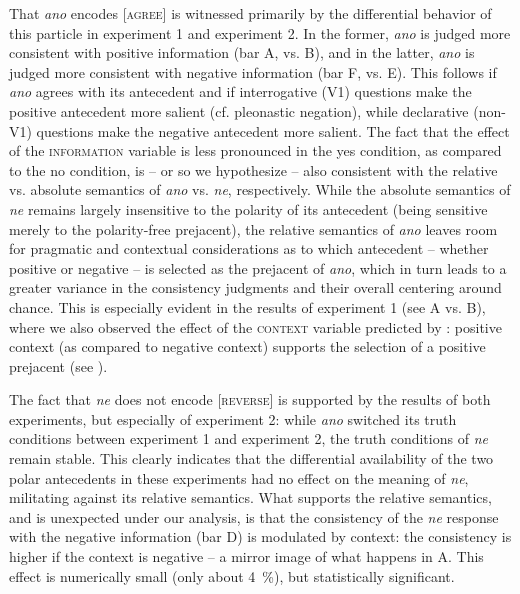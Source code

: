 \documentclass[output=paper,colorlinks,citecolor=brown]{langscibook}
\begin{document}
That \textit{ano} encodes \textsc{[agree]} is witnessed primarily by the differential behavior of this particle in experiment 1 and experiment 2. In the former, \textit{ano} is judged more consistent with positive information (bar A, vs. B), and in the latter, \textit{ano} is judged more consistent with negative information (bar F, vs. E). This follows if \textit{ano} agrees with its antecedent and if interrogative (V1) questions make the positive antecedent more salient (cf. pleonastic negation), while declarative (non-V1) questions make the negative antecedent more salient. The fact that the effect of the \textsc{information} variable is less pronounced in the \textsf{yes} condition, as compared to the \textsf{no} condition, is -- or so we hypothesize -- also consistent with the relative vs. absolute semantics of \textit{ano} vs. \textit{ne}, respectively. While the absolute semantics of \textit{ne} remains largely insensitive to the polarity of its antecedent (being sensitive merely to the polarity-free prejacent), the relative semantics of \textit{ano} leaves room for pragmatic and contextual considerations as to which antecedent -- whether positive or negative -- is selected as the prejacent of \textit{ano}, which in turn leads to a greater variance in the consistency judgments and their overall centering around chance. This is especially evident in the results of experiment 1 (see A vs. B), where we also observed the effect of the \textsc{context} variable predicted by \citet{hrd+:krifka13}: positive context (as compared to negative context) supports the selection of a positive prejacent (see ).

The fact that \textit{ne} does not encode \textsc{[reverse]} is supported by the results of both experiments, but especially of experiment 2: while \textit{ano} switched its truth conditions between experiment 1 and experiment 2, the truth conditions of \textit{ne} remain stable. This clearly indicates that the differential availability of the two polar antecedents in these experiments had no effect on the meaning of \textit{ne}, militating against its relative semantics. What supports the relative semantics, and is unexpected under our analysis, is that the consistency of the \textit{ne} response with the negative information (bar D) is modulated by context: the consistency is higher if the context is negative -- a mirror image of what happens in A. This effect is numerically small (only about \qty{4}{\percent}), but statistically significant.
\end{document}
